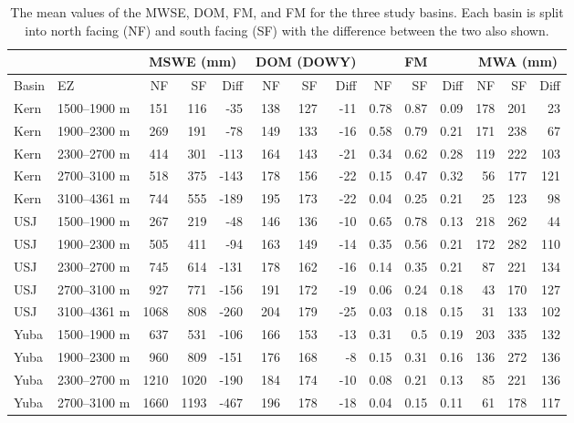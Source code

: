\begin{table}[htbp]
\centering
\caption{The mean values of the MWSE, DOM, FM, and FM for the three study basins. Each basin is split into north facing (NF) and south facing (SF) with the difference between the two also shown.}
\label{tab:snow_metric_table}
\tiny %
\begin{tabular}{llrrrrrrrrrrrr}
\toprule
& & \multicolumn{3}{c}{MSWE (mm)} & \multicolumn{3}{c}{DOM (DOWY)} & \multicolumn{3}{c}{FM} & \multicolumn{3}{c}{MWA (mm)} \\
\midrule
Basin & EZ & NF & SF & Diff & NF & SF & Diff & NF & SF & Diff & NF & SF & Diff \\
\midrule
Kern & 1500--1900 m & 151 & 116 & -35 & 138 & 127 & -11 & 0.78 & 0.87 & 0.09 & 178 & 201 & 23 \\
Kern & 1900--2300 m & 269 & 191 & -78 & 149 & 133 & -16 & 0.58 & 0.79 & 0.21 & 171 & 238 & 67 \\
Kern & 2300--2700 m & 414 & 301 & -113 & 164 & 143 & -21 & 0.34 & 0.62 & 0.28 & 119 & 222 & 103 \\
Kern & 2700--3100 m & 518 & 375 & -143 & 178 & 156 & -22 & 0.15 & 0.47 & 0.32 & 56 & 177 & 121 \\
Kern & 3100--4361 m & 744 & 555 & -189 & 195 & 173 & -22 & 0.04 & 0.25 & 0.21 & 25 & 123 & 98 \\
USJ & 1500--1900 m & 267 & 219 & -48 & 146 & 136 & -10 & 0.65 & 0.78 & 0.13 & 218 & 262 & 44 \\
USJ & 1900--2300 m & 505 & 411 & -94 & 163 & 149 & -14 & 0.35 & 0.56 & 0.21 & 172 & 282 & 110 \\
USJ & 2300--2700 m & 745 & 614 & -131 & 178 & 162 & -16 & 0.14 & 0.35 & 0.21 & 87 & 221 & 134 \\
USJ & 2700--3100 m & 927 & 771 & -156 & 191 & 172 & -19 & 0.06 & 0.24 & 0.18 & 43 & 170 & 127 \\
USJ & 3100--4361 m & 1068 & 808 & -260 & 204 & 179 & -25 & 0.03 & 0.18 & 0.15 & 31 & 133 & 102 \\
Yuba & 1500--1900 m & 637 & 531 & -106 & 166 & 153 & -13 & 0.31 & 0.5 & 0.19 & 203 & 335 & 132 \\
Yuba & 1900--2300 m & 960 & 809 & -151 & 176 & 168 & -8 & 0.15 & 0.31 & 0.16 & 136 & 272 & 136 \\
Yuba & 2300--2700 m & 1210 & 1020 & -190 & 184 & 174 & -10 & 0.08 & 0.21 & 0.13 & 85 & 221 & 136 \\
Yuba & 2700--3100 m & 1660 & 1193 & -467 & 196 & 178 & -18 & 0.04 & 0.15 & 0.11 & 61 & 178 & 117 \\
\bottomrule
\end{tabular}
\end{table}



